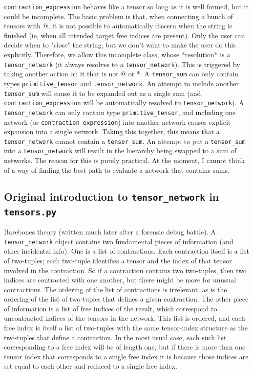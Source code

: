 \documentclass[12pt,letterpaper]{article}
\begin{document}
\texttt{contraction\_expression}
behaves like a tensor so long as it is well formed, but it could be incomplete.  The basic problem
is that, when connecting a bunch of tensors with @, it is not possible to automatically discern
when the string is finished (ie, when all intended target free indices are present).  Only the user can decide
when to "close" the string, but we don't want to make the user do this explicitly.  Therefore,
we allow this incomplete class, whose *resolution* is a \texttt{tensor\_network} (it always resolves to a
\texttt{tensor\_network}). This is triggered by taking another action on it that is not @ or *.  A \texttt{tensor\_sum}
can only contain types \texttt{primitive\_tensor} and \texttt{tensor\_network}.  An attempt to include another
\texttt{tensor\_sum} will cause it to be expanded out as a single sum (and \texttt{contraction\_expression} will 
be automatically resolved to \texttt{tensor\_network}).  A \texttt{tensor\_network} can only contain
type \texttt{primitive\_tensor}, and including one network (or \texttt{contraction\_expression}) into another network causes explicit expansion
into a single network.  Taking this together, this means that a \texttt{tensor\_network} cannot contain a 
\texttt{tensor\_sum}.  An attempt to put a \texttt{tensor\_sum} into a \texttt{tensor\_network} will result in the hierarchy
being swapped to a sum of networks.  The reason for this is purely practical.  At the moment,
I cannot think of a way of finding the best path to evaluate a network that contains sums.

	\subsection{Original introduction to \texttt{tensor\_network} in \texttt{tensors.py}}

Barebones theory (written much later after a forensic debug battle).  A \texttt{tensor\_network} object contains
two fundamental pieces of information (and other incidental info).  One is a list of contractions.
Each contraction itself is a list of two-tuples; each two-tuple identifies a tensor and the index
of that tensor involved in the contraction.  So if a contraction contains two two-tuples, then 
two indices are contracted with one another, but there might be more for unusual contractions.
The ordering of the list of contractions is irrelevant, as is the ordering of the list of two-tuples
that defines a given contraction. The other piece of information is a list of free indices of the result,
which correspond to uncontracted indices of the tensors in the network.  This list is ordered, and each
free index is itself a list of two-tuples with the same tensor-index structure as the two-tuples that
define a contraction.  In the most usual case, each such list corresponding to a free index will be of
length one, but if there is more than one tensor index that corresponds to a single free index it is because
those indices are set equal to each other and reduced to a single free index.
\end{document}
